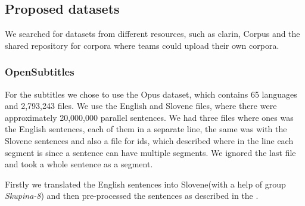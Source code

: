 \documentclass[fleqn,moreauthors,10pt]{ds_report}
\begin{document}

\subsection{Proposed datasets}
We searched for datasets from different resources, such as clarin\cite{Clarin}, Corpus\cite{opensubtitles} \cite{TIEDEMANN12.463} and the shared repository for corpora where teams could upload their own corpora.

\subsubsection{OpenSubtitles}
\label{sub-sec:open-sub}
For the subtitles we chose to use the Opus\cite{opensubtitles} \cite{TIEDEMANN12.463} dataset, which contains 65 languages and 2,793,243 files. We use the English and Slovene files, where there were approximately 20,000,000 parallel sentences. We had three files where ones was the English sentences, each of them in a separate line, the same was with the Slovene sentences and also a file for ids, which described where in the line each segment is since a sentence can have multiple segments. We ignored the last file and took a whole sentence as a segment.

Firstly we translated the English sentences into Slovene(with a help of group \emph{Skupina-8}) and then pre-processed the sentences as described in the .
\end{document}

